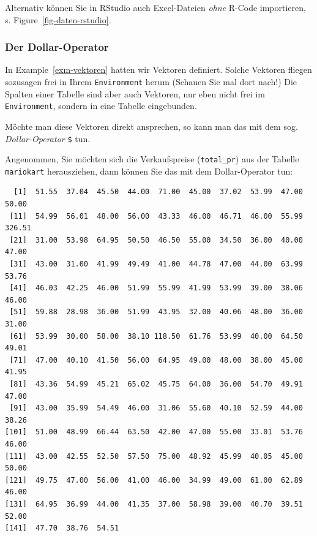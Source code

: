 \documentclass[
  letterpaper,
  DIV=11,
  numbers=noendperiod]{scrartcl}
\newenvironment{Shaded}{\begin{snugshade}}{\end{snugshade}}
\newcommand{\NormalTok}[1]{\textcolor[rgb]{0.00,0.23,0.31}{#1}}
\newcommand{\SpecialCharTok}[1]{\textcolor[rgb]{0.37,0.37,0.37}{#1}}
\theoremstyle{definition}
\theoremstyle{definition}
\theoremstyle{definition}
\theoremstyle{remark}
\begin{document}
Alternativ können Sie in RStudio auch Excel-Dateien \emph{ohne} R-Code
importieren, s. Figure~\ref{fig-daten-rstudio}.

\subsubsection{Der Dollar-Operator}\label{sec-dollar-op}

In Example~\ref{exm-vektoren} hatten wir Vektoren definiert. Solche
Vektoren fliegen sozusagen frei in Ihrem \texttt{Environment} herum
(Schauen Sie mal dort nach!) Die Spalten einer Tabelle sind aber auch
Vektoren, nur eben nicht frei im \texttt{Environment}, sondern in eine
Tabelle eingebunden.

Möchte man diese Vektoren direkt ansprechen, so kann man das mit dem
sog. \emph{Dollar-Operator} \texttt{\$} tun.

Angenommen, Sie möchten sich die Verkaufspreise (\texttt{total\_pr}) aus
der Tabelle \texttt{mariokart} herausziehen, dann können Sie das mit dem
Dollar-Operator tun:

\begin{Shaded}
\end{Shaded}

\begin{verbatim}
  [1]  51.55  37.04  45.50  44.00  71.00  45.00  37.02  53.99  47.00  50.00
 [11]  54.99  56.01  48.00  56.00  43.33  46.00  46.71  46.00  55.99 326.51
 [21]  31.00  53.98  64.95  50.50  46.50  55.00  34.50  36.00  40.00  47.00
 [31]  43.00  31.00  41.99  49.49  41.00  44.78  47.00  44.00  63.99  53.76
 [41]  46.03  42.25  46.00  51.99  55.99  41.99  53.99  39.00  38.06  46.00
 [51]  59.88  28.98  36.00  51.99  43.95  32.00  40.06  48.00  36.00  31.00
 [61]  53.99  30.00  58.00  38.10 118.50  61.76  53.99  40.00  64.50  49.01
 [71]  47.00  40.10  41.50  56.00  64.95  49.00  48.00  38.00  45.00  41.95
 [81]  43.36  54.99  45.21  65.02  45.75  64.00  36.00  54.70  49.91  47.00
 [91]  43.00  35.99  54.49  46.00  31.06  55.60  40.10  52.59  44.00  38.26
[101]  51.00  48.99  66.44  63.50  42.00  47.00  55.00  33.01  53.76  46.00
[111]  43.00  42.55  52.50  57.50  75.00  48.92  45.99  40.05  45.00  50.00
[121]  49.75  47.00  56.00  41.00  46.00  34.99  49.00  61.00  62.89  46.00
[131]  64.95  36.99  44.00  41.35  37.00  58.98  39.00  40.70  39.51  52.00
[141]  47.70  38.76  54.51
\end{verbatim}
\end{document}
